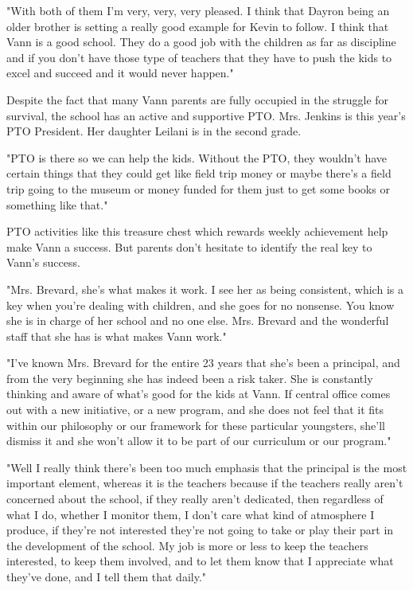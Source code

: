 "With both of them I'm very, very, very pleased. I think that Dayron being an older brother is setting a really good example for Kevin to follow. I think that Vann is a good school. They do a good job with the children as far as discipline and if you don't have those type of teachers that they have to push the kids to excel and succeed and it would never happen."

Despite the fact that many Vann parents are fully occupied in the struggle for survival, the school has an active and supportive PTO. Mrs. Jenkins is this year's PTO President. Her daughter Leilani is in the second grade.

"PTO is there so we can help the kids. Without the PTO, they wouldn't have certain things that they could get like field trip money or maybe there's a field trip going to the museum or money funded for them just to get some books or something like that."

PTO activities like this treasure chest which rewards weekly achievement help make Vann a success. But parents don't hesitate to identify the real key to Vann's success.

"Mrs. Brevard, she's what makes it work. I see her as being consistent, which is a key when you're dealing with children, and she goes for no nonsense. You know she is in charge of her school and no one else. Mrs. Brevard and the wonderful staff that she has is what makes Vann work."

"I've known Mrs. Brevard for the entire 23 years that she's been a principal, and from the very beginning she has indeed been a risk taker. She is constantly thinking and aware of what's good for the kids at Vann. If central office comes out with a new initiative, or a new program, and she does not feel that it fits within our philosophy or our framework for these particular youngsters, she'll dismiss it and she won't allow it to be part of our curriculum or our program."

"Well I really think there's been too much emphasis that the principal is the most important element, whereas it is the teachers because if the teachers really aren't concerned about the school, if they really aren't dedicated, then regardless of what I do, whether I monitor them, I don't care what kind of atmosphere I produce, if they're not interested they're not going to take or play their part in the development of the school. My job is more or less to keep the teachers interested, to keep them involved, and to let them know that I appreciate what they've done, and I tell them that daily."

